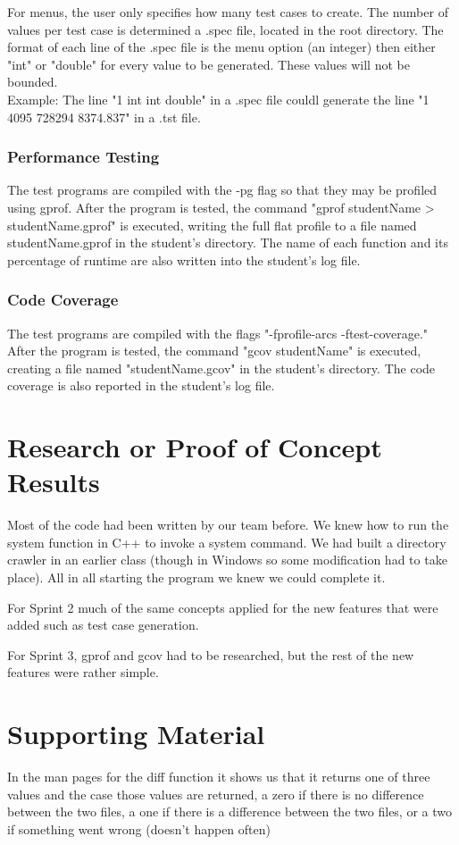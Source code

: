For menus, the user only specifies how many test cases to create. The number of values per test case is determined a .spec file, located in the root directory. The format of each line of the .spec file is the menu option (an integer) then either "int" or "double" for every value to be generated. These values will not be bounded. \\
Example: The line "1 int int double" in a .spec file couldl generate the line "1 4095 728294 8374.837" in a .tst file.

\subsubsection{Performance Testing}
The test programs are compiled with the -pg flag so that they may be profiled using gprof. After the program is tested, the command "gprof studentName > studentName.gprof" is executed, writing the full flat profile to a file named studentName.gprof in the student's directory. The name of each function and its percentage of runtime are also written into the student's log file.

\subsubsection{Code Coverage}
The test programs are compiled with the flags "-fprofile-arcs -ftest-coverage." After the program is tested, the command "gcov studentName" is executed, creating a file named "studentName.gcov" in the student's directory. The code coverage is also reported in the student's log file.

\section{Research or Proof of Concept Results}
Most of the code had been written by our team before.   We knew how to run the system 
function in C++ to invoke a system command. We had built a directory crawler in an earlier 
class (though in Windows so some modification had to take place).   All in all starting the 
program we knew we could complete it.

For Sprint 2 much of the same concepts applied for the new features that were added such as
test case generation.

For Sprint 3, gprof and gcov had to be researched, but the rest of the new features were rather simple.

\section{Supporting Material}

In the man pages for the diff function it shows us that it returns one of three values and 
the case those values are returned, a zero if there is no difference between the two files, 
a one if there is a difference between the two files, or a two if something went wrong (doesn't happen often)

